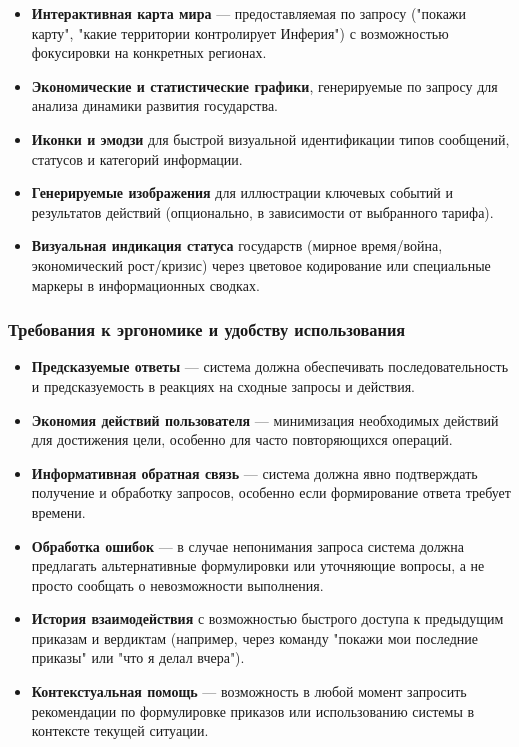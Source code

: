 \begin{itemize}
    \item \textbf{Интерактивная карта мира} — предоставляемая по запросу ("покажи карту", "какие территории контролирует Инферия") с возможностью фокусировки на конкретных регионах.

    \item \textbf{Экономические и статистические графики}, генерируемые по запросу для анализа динамики развития государства.

    \item \textbf{Иконки и эмодзи} для быстрой визуальной идентификации типов сообщений, статусов и категорий информации.

    \item \textbf{Генерируемые изображения} для иллюстрации ключевых событий и результатов действий (опционально, в зависимости от выбранного тарифа).

    \item \textbf{Визуальная индикация статуса} государств (мирное время/война, экономический рост/кризис) через цветовое кодирование или специальные маркеры в информационных сводках.
\end{itemize}

\subsubsection{Требования к эргономике и удобству использования}

\begin{itemize}
    \item \textbf{Предсказуемые ответы} — система должна обеспечивать последовательность и предсказуемость в реакциях на сходные запросы и действия.

    \item \textbf{Экономия действий пользователя} — минимизация необходимых действий для достижения цели, особенно для часто повторяющихся операций.

    \item \textbf{Информативная обратная связь} — система должна явно подтверждать получение и обработку запросов, особенно если формирование ответа требует времени.

    \item \textbf{Обработка ошибок} — в случае непонимания запроса система должна предлагать альтернативные формулировки или уточняющие вопросы, а не просто сообщать о невозможности выполнения.

    \item \textbf{История взаимодействия} с возможностью быстрого доступа к предыдущим приказам и вердиктам (например, через команду "покажи мои последние приказы" или "что я делал вчера").

    \item \textbf{Контекстуальная помощь} — возможность в любой момент запросить рекомендации по формулировке приказов или использованию системы в контексте текущей ситуации.
\end{itemize}


